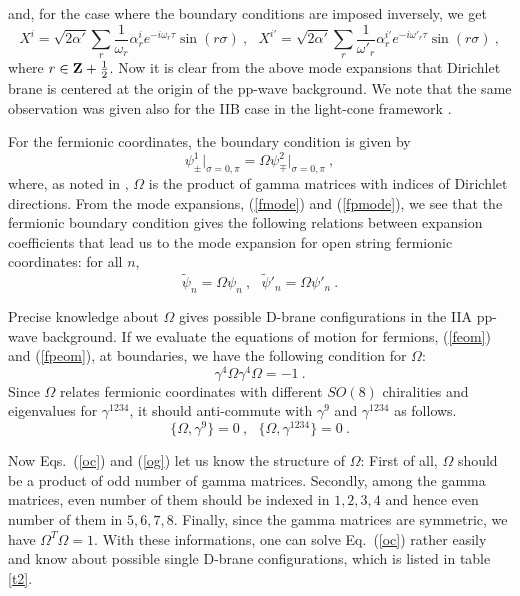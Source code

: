 \documentclass[a4paper,12pt]{article}
\begin{document}
and, for the case where the boundary conditions are imposed inversely,
we get
\begin{equation}
X^i = \sqrt{ 2 \alpha' } \sum_r
         \frac{1}{\omega_r} 
       \alpha^i_r e^{-i \omega_r \tau} \sin (r \sigma)~,~~~
X^{i'} = \sqrt{ 2 \alpha' } \sum_r
         \frac{1}{\omega'_r} 
       \alpha^{i'}_r e^{-i \omega'_r \tau} \sin (r \sigma) ~,
\label{obmode2}
\end{equation}
where $r \in {\bf Z} + \frac{1}{2}$.  Now it is clear from the above
mode expansions that Dirichlet brane is centered at the origin of the
pp-wave background.  We note that the same observation was given also
for the IIB case in the light-cone framework \cite{dab231}.

For the fermionic coordinates, the boundary condition is given by
\begin{equation}
\psi^1_\pm \Big|_{\sigma=0,\pi} 
 = \Omega \psi^2_\mp \Big|_{\sigma=0,\pi} ~,
\label{fbc}
\end{equation}
where, as noted in \cite{dab231}, $\Omega$ is the product of gamma
matrices with indices of Dirichlet directions.  From the mode
expansions, (\ref{fmode}) and (\ref{fpmode}), we see that the
fermionic boundary condition gives the following relations between
expansion coefficients that lead us to the mode expansion for open
string fermionic coordinates: for all $n$,
\begin{equation}
\tilde{\psi}_n = \Omega \psi_n ~,~~~
\tilde{\psi}'_n = \Omega \psi'_n ~.
\label{fmbc}
\end{equation}

Precise knowledge about $\Omega$ gives possible D-brane configurations
in the IIA pp-wave background.  If we evaluate the equations of motion
for fermions, (\ref{feom}) and (\ref{fpeom}), at boundaries, we have
the following condition for $\Omega$:
\begin{equation}
\gamma^4 \Omega \gamma^4 \Omega = -1 ~.
\label{oc}
\end{equation}
Since $\Omega$ relates fermionic coordinates with different $SO(8)$
chiralities and eigenvalues for $\gamma^{1234}$, it should
anti-commute with $\gamma^9$ and $\gamma^{1234}$ as follows.
\begin{equation}
\{ \Omega, \gamma^9 \} = 0 ~, ~~~
\{ \Omega, \gamma^{1234} \} = 0 ~.
\label{og}
\end{equation}

Now Eqs.~(\ref{oc}) and (\ref{og}) let us know the structure of
$\Omega$: First of all, $\Omega$ should be a product of odd number of
gamma matrices.  Secondly, among the gamma matrices, even number of
them should be indexed in $1,2,3,4$ and hence even number of them in
$5,6,7,8$.  Finally, since the gamma matrices are symmetric, we have
$\Omega^T \Omega = 1$.  With these informations, one can solve
Eq.~(\ref{oc}) rather easily and know about possible single D-brane
configurations, which is listed in table \ref{t2}.
\end{document}
